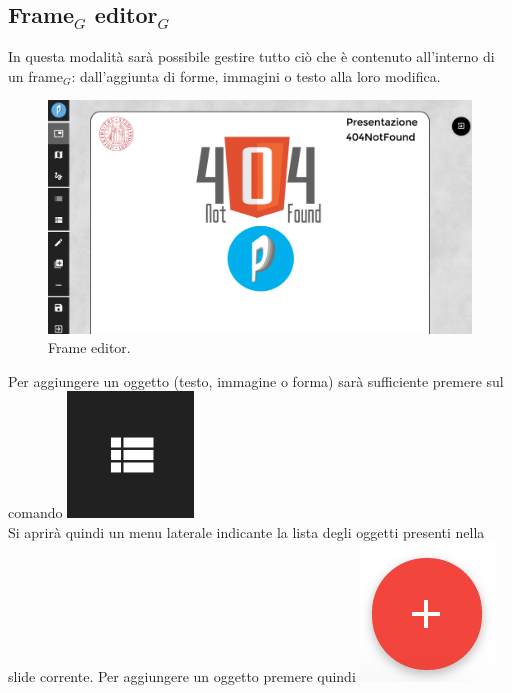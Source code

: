 \subsection{Frame$_G$ editor$_G$}
In questa modalità sarà possibile gestire tutto ciò che è contenuto all'interno di un frame$_G$: dall'aggiunta di forme,  immagini o testo alla loro modifica.\\

\begin{figure}[!h]
\begin{center}
\includegraphics[scale=0.35]{img/frame_editor_screen.png}
\caption{Frame editor.}
\end{center}
\end{figure}

Per aggiungere un oggetto (testo, immagine o forma) sarà sufficiente premere sul comando \includegraphics[scale=0.4]{img/slides_object.png}\\

Si aprirà quindi un menu laterale indicante la lista degli oggetti presenti nella slide corrente. Per aggiungere un oggetto premere quindi \includegraphics[scale=0.4]{img/add.png}\\

